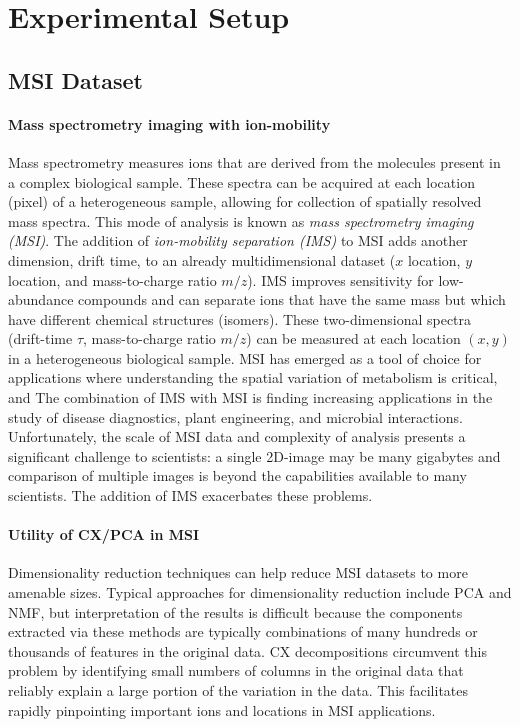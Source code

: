 \section{Experimental Setup}
\label{sec:setup}

\subsection{MSI Dataset}
\paragraph{Mass spectrometry imaging with ion-mobility}
Mass spectrometry measures ions that are derived from the molecules present in a complex biological sample.
These spectra can be acquired at each location (pixel) of a heterogeneous sample, allowing for collection of spatially
resolved mass spectra.
This mode of analysis is known as \textit{mass spectrometry imaging (MSI)}.
The addition of \textit{ion-mobility separation (IMS)} to MSI adds another dimension, drift time, to an already multidimensional
dataset ($x$ location, $y$ location, and mass-to-charge ratio $m/z$).
IMS improves sensitivity for low-abundance compounds and can separate ions that have the same mass but which have
different chemical structures (isomers).
These two-dimensional spectra (drift-time $\tau$, mass-to-charge ratio $m/z$) can be measured at each location $(x, y)$ in a
heterogeneous biological sample.
MSI has emerged as a tool of choice for applications where understanding the spatial variation of metabolism is critical, and  
The combination of IMS with MSI is finding increasing applications in the study of disease diagnostics, plant
engineering, and microbial interactions. Unfortunately, the scale of MSI data and complexity of analysis presents a significant challenge to
scientists: a single 2D-image may be many gigabytes and comparison of multiple images is beyond the capabilities
available to many scientists. The addition of IMS exacerbates these problems.

\paragraph{Utility of CX/PCA in MSI}
Dimensionality reduction techniques can help reduce MSI datasets to more amenable sizes.
Typical approaches for dimensionality reduction include PCA and NMF, but interpretation of the results is difficult
because the components extracted via these methods are typically combinations of many hundreds or thousands of features in the original data.
CX decompositions circumvent this problem by identifying small numbers of columns in the
original data that reliably explain a large portion of the variation in the data.
This facilitates rapidly pinpointing important ions and locations in MSI applications.

